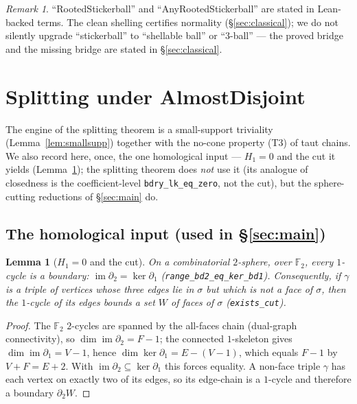 \documentclass[11pt]{article}
\theoremstyle{plain}
\newtheorem{lemma}[theorem]{Lemma}
\theoremstyle{definition}
\theoremstyle{remark}
\newtheorem*{remark}{Remark}
\newcommand{\bd}{\partial}
\newcommand{\F}{\mathbb{F}}
\newcommand{\code}[1]{\texttt{#1}}
\begin{document}
\begin{remark}
``RootedStickerball'' and ``AnyRootedStickerball'' are stated in Lean-backed terms. The
clean shelling certifies normality (\S\ref{sec:classical}); we do not silently upgrade
``stickerball'' to ``shellable ball'' or ``$3$-ball'' --- the proved bridge and the missing
bridge are stated in \S\ref{sec:classical}.
\end{remark}

\section{Splitting under AlmostDisjoint}\label{sec:split}

The engine of the splitting theorem is a small-support triviality (Lemma~\ref{lem:smallsupp})
together with the no-cone property (T3) of taut chains. We also record here, once, the one
homological input --- $H_1=0$ and the cut it yields (Lemma~\ref{lem:cut}); the splitting theorem
does \emph{not} use it (its analogue of closedness is the coefficient-level
\code{bdry\_lk\_eq\_zero}, not the cut), but the sphere-cutting reductions of \S\ref{sec:main} do.

\subsection*{The homological input (used in \S\ref{sec:main})}

\begin{lemma}[$H_1=0$ and the cut]\label{lem:cut}
On a combinatorial $2$-sphere, over $\F_2$, every $1$-cycle is a boundary:
$\operatorname{im}\bd_2=\ker\bd_1$ (\code{range\_bd2\_eq\_ker\_bd1}). Consequently, if
$\gamma$ is a triple of vertices whose three edges lie in $\sigma$ but which is not a face
of $\sigma$, then the $1$-cycle of its edges bounds a set $W$ of faces of $\sigma$
(\code{exists\_cut}).
\end{lemma}

\begin{proof}
The $\F_2$ $2$-cycles are spanned by the all-faces chain (dual-graph connectivity), so
$\dim\operatorname{im}\bd_2=F-1$; the connected $1$-skeleton gives
$\dim\operatorname{im}\bd_1=V-1$, hence $\dim\ker\bd_1=E-(V-1)$, which equals $F-1$ by
$V+F=E+2$. With $\operatorname{im}\bd_2\subseteq\ker\bd_1$ this forces equality. A non-face
triple $\gamma$ has each vertex on exactly two of its edges, so its edge-chain is a
$1$-cycle and therefore a boundary $\bd_2 W$.
\end{proof}
\end{document}
